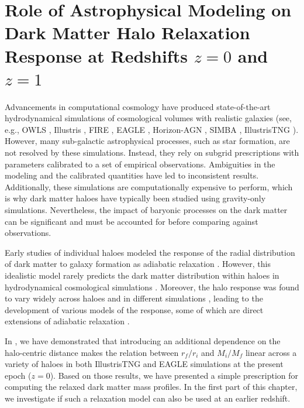 \chapter{Role of Astrophysical Modeling on Dark Matter Halo Relaxation Response at Redshifts $z=0$ and $z=1$}
\label{chap:physvar_z01}

Advancements in computational cosmology have produced state-of-the-art hydrodynamical simulations of cosmological volumes with realistic galaxies (see, e.g., OWLS \citep{2010MNRAS.402.1536S}, Illustris \citep{2014MNRAS.445..175G}, FIRE \citep{2014MNRAS.445..581H}, EAGLE \citep{2015MNRAS.446..521S}, Horizon-AGN \citep[][]{2017MNRAS.467.4739K}, SIMBA \citep[][]{2019MNRAS.486.2827D}, IllustrisTNG \citep{2019ComAC...6....2N}). However, many sub-galactic astrophysical processes, such as star formation, are not resolved by these simulations. Instead, they rely on subgrid prescriptions with parameters calibrated to a set of empirical observations. Ambiguities in the modeling and the calibrated quantities have led to inconsistent results. Additionally, these simulations are computationally expensive to perform, which is why dark matter haloes have typically been studied using gravity-only simulations. Nevertheless, the impact of baryonic processes on the dark matter can be significant and must be accounted for before comparing against observations.

Early studies of individual haloes modeled the response of the radial distribution of dark matter to galaxy formation as adiabatic relaxation \citep[][]{osti6457593,1984MNRAS.211..753B,1986ApJ...301...27B,1987ApJ...318...15R}. However, this idealistic model rarely predicts the dark matter distribution within haloes in hydrodynamical cosmological simulations \citep[e.g.,][]{2004ApJ...616...16G,2010MNRAS.407..435A}. Moreover, the halo response was found to vary widely across haloes and in different simulations \citep[][]{2004ApJ...616...16G,2006PhRvD..74l3522G,2010MNRAS.402..776P,2010MNRAS.406..922T,2010MNRAS.405.2161D,2010MNRAS.407..435A,2011MNRAS.414..195T,2016MNRAS.461.2658D,2019A&A...622A.197A,2022MNRAS.511.3910F,2023Velmani&Paranjape}, leading to the development of various models of the response, some of which are direct extensions of adiabatic relaxation \citep[e.g.,][]{2004ApJ...616...16G,2006PhRvD..74l3522G,2010MNRAS.407..435A}.

In , we have demonstrated that introducing an additional dependence on the halo-centric distance makes the relation between $r_f/r_i$ and $M_i/M_f$ linear across a variety of haloes in both IllustrisTNG and EAGLE simulations at the present epoch ($z=0$). Based on those results, we have presented a simple prescription for computing the relaxed dark matter mass profiles. In the first part of this chapter, we investigate if such a relaxation model can also be used at an earlier redshift.

